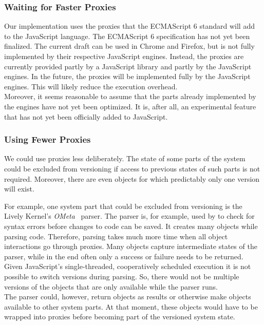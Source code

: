 \subsubsection{Waiting for Faster Proxies}

Our implementation uses the proxies that the ECMAScript 6 standard will add to the JavaScript language.
The ECMAScript 6 specification has not yet been finalized.
The current draft can be used in Chrome and Firefox, but is not fully implemented by their respective JavaScript engines.
Instead, the proxies are currently provided partly by a JavaScript library and partly by the JavaScript engines.
In the future, the proxies will be implemented fully by the JavaScript engines.
This will likely reduce the execution overhead.\\
Moreover, it seems reasonable to assume that the parts already implemented by the engines have not yet been optimized. 
It is, after all, an experimental feature that has not yet been officially added to JavaScript.

\subsubsection{Using Fewer Proxies}

We could use proxies less deliberately.
The state of some parts of the system could be excluded from versioning if access to previous states of such parts is not required.
Moreover, there are even objects for which predictably only one version will exist.

For example, one system part that could be excluded from versioning is the Lively Kernel's \emph{OMeta}~\cite{Warth2007OOL} parser.
The parser is, for example, used by to check for syntax errors before changes to code can be saved.
It creates many objects while parsing code.
Therefore, parsing takes much more time when all object interactions go through proxies.
Many objects capture intermediate states of the parser, while in the end often only a success or failure needs to be returned.
Given JavaScript's single-threaded, cooperatively scheduled execution it is not possible to switch versions during parsing.
So, there would not be multiple versions of the objects that are only available while the parser runs.\\
The parser could, however, return objects as results or otherwise make objects available to other system parts.
At that moment, these objects would have to be wrapped into proxies before becoming part of the versioned system state.

